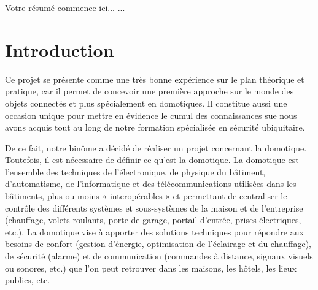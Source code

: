    Votre résumé commence ici...
   ...


\newpage
\tableofcontents
\clearpage

%
% 
%
%
%
%



\chapter{Introduction}

Ce projet se présente comme une très bonne expérience sur le plan théorique et pratique, car il permet de concevoir une première approche sur le monde des objets connectés et plus spécialement en domotiques. Il constitue aussi une occasion unique pour mettre en évidence le cumul des connaissances sue nous avons acquis tout au long de notre formation spécialisée en sécurité ubiquitaire.
\newline

De ce fait, notre binôme a décidé de réaliser un projet concernant la domotique. Toutefois, il est nécessaire de définir ce qu'est la domotique. La domotique est l'ensemble des techniques de l'électronique, de physique du bâtiment, d'automatisme, de l'informatique et des télécommunications utilisées dans les bâtiments, plus ou moins « interopérables » et permettant de centraliser le contrôle des différents systèmes et sous-systèmes de la maison et de l'entreprise (chauffage, volets roulants, porte de garage, 
portail d'entrée, prises électriques, etc.). La domotique vise à apporter des solutions techniques pour répondre aux besoins de 
confort (gestion d'énergie, optimisation de l'éclairage et du chauffage), de sécurité (alarme) et de communication (commandes à 
distance, signaux visuels ou sonores, etc.) que l'on peut retrouver dans les maisons, les hôtels, les lieux publics, etc.


